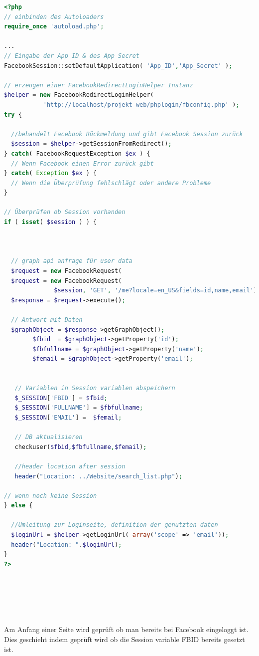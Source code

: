\documentclass[11pt,a4paper]{scrreprt}
\begin{document}
\begin{lstlisting}[language=PHP, frame=single, captionpos=b,caption= fbconfig.php]
<?php
// einbinden des Autoloaders
require_once 'autoload.php';

...
// Eingabe der App ID & des App Secret
FacebookSession::setDefaultApplication( 'App_ID','App_Secret' );

// erzeugen einer FacebookRedirectLoginHelper Instanz
$helper = new FacebookRedirectLoginHelper(
           'http://localhost/projekt_web/phplogin/fbconfig.php' );
try {

  //behandelt Facebook Rückmeldung und gibt Facebook Session zurück
  $session = $helper->getSessionFromRedirect();
} catch( FacebookRequestException $ex ) {
  // Wenn Facebook einen Error zurück gibt
} catch( Exception $ex ) {
  // Wenn die Überprüfung fehlschlägt oder andere Probleme
}

// Überprüfen ob Session vorhanden
if ( isset( $session ) ) {



  // graph api anfrage für user data
  $request = new FacebookRequest( 
  $request = new FacebookRequest( 
              $session, 'GET', '/me?locale=en_US&fields=id,name,email');
  $response = $request->execute();
  
  // Antwort mit Daten
  $graphObject = $response->getGraphObject();
        $fbid  = $graphObject->getProperty('id');
        $fbfullname = $graphObject->getProperty('name');
        $femail = $graphObject->getProperty('email');    

	    
   // Variablen in Session variablen abspeichern
   $_SESSION['FBID'] = $fbid;           
   $_SESSION['FULLNAME'] = $fbfullname;
   $_SESSION['EMAIL'] =  $femail;
    
   // DB aktualisieren
   checkuser($fbid,$fbfullname,$femail);
    
   //header location after session
   header("Location: ../Website/search_list.php");

// wenn noch keine Session   
} else {

  //Umleitung zur Loginseite, definition der genutzten daten
  $loginUrl = $helper->getLoginUrl( array('scope' => 'email'));
  header("Location: ".$loginUrl);
}
?>




 	    
\end{lstlisting}

\newpage
\noindent
Am Anfang einer Seite wird geprüft ob man bereits bei Facebook eingeloggt ist. Dies geschieht indem geprüft wird ob die Session variable FBID bereits gesetzt ist.
\end{document}

